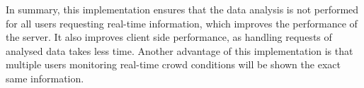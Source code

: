 In summary, this implementation ensures that the data analysis is not performed for all users requesting real-time information, which improves the performance of the server. It also improves client side performance, as handling requests of analysed data takes less time. Another advantage of this implementation is that multiple users monitoring real-time crowd conditions will be shown the exact same information.
